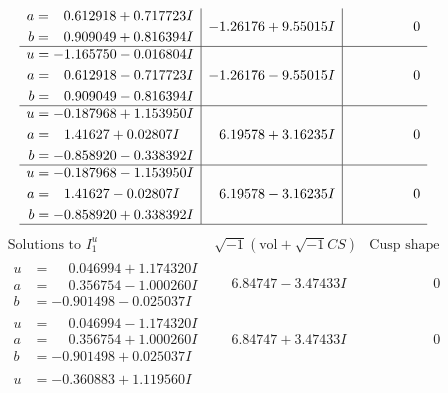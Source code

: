 \documentclass[1p]{elsarticle_modified}
\theoremstyle{definition}
\newcommand{\I}{\sqrt{-1}}
\begin{document}
$$\begin{array}{c|c|c}
\begin{aligned}
a &= \phantom{-}0.612918 + 0.717723 I \\
b &= \phantom{-}0.909049 + 0.816394 I\end{aligned}
 & -1.26176 + 9.55015 I & \phantom{-0.000000 } 0 \\ \hline\begin{aligned}
u &= -1.165750 - 0.016804 I \\
a &= \phantom{-}0.612918 - 0.717723 I \\
b &= \phantom{-}0.909049 - 0.816394 I\end{aligned}
 & -1.26176 - 9.55015 I & \phantom{-0.000000 } 0 \\ \hline\begin{aligned}
u &= -0.187968 + 1.153950 I \\
a &= \phantom{-}1.41627 + 0.02807 I \\
b &= -0.858920 - 0.338392 I\end{aligned}
 & \phantom{-}6.19578 + 3.16235 I & \phantom{-0.000000 } 0 \\ \hline\begin{aligned}
u &= -0.187968 - 1.153950 I \\
a &= \phantom{-}1.41627 - 0.02807 I \\
b &= -0.858920 + 0.338392 I\end{aligned}
 & \phantom{-}6.19578 - 3.16235 I & \phantom{-0.000000 } 0\\
 \hline 
 \end{array}$$\newpage$$\begin{array}{c|c|c}  
\text{Solutions to }I^u_{1}& \I (\text{vol} + \sqrt{-1}CS) & \text{Cusp shape}\\
 \hline 
\begin{aligned}
u &= \phantom{-}0.046994 + 1.174320 I \\
a &= \phantom{-}0.356754 - 1.000260 I \\
b &= -0.901498 - 0.025037 I\end{aligned}
 & \phantom{-}6.84747 - 3.47433 I & \phantom{-0.000000 } 0 \\ \hline\begin{aligned}
u &= \phantom{-}0.046994 - 1.174320 I \\
a &= \phantom{-}0.356754 + 1.000260 I \\
b &= -0.901498 + 0.025037 I\end{aligned}
 & \phantom{-}6.84747 + 3.47433 I & \phantom{-0.000000 } 0 \\ \hline\begin{aligned}
u &= -0.360883 + 1.119560 I \\

\end{aligned}
\end{array}$$
\end{document}
